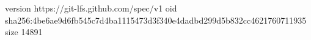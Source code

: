 version https://git-lfs.github.com/spec/v1
oid sha256:4be6ae9d6fb545c7d4ba1115473d3f340e4dadbd299d5b832cc4621760711935
size 14891
